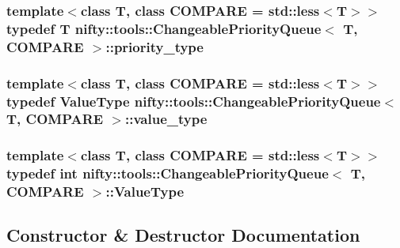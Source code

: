 \subsubsection[{priority\+\_\+type}]{\setlength{\rightskip}{0pt plus 5cm}template$<$class T, class C\+O\+M\+P\+A\+R\+E = std\+::less$<$\+T$>$$>$ typedef T {\bf nifty\+::tools\+::\+Changeable\+Priority\+Queue}$<$ T, C\+O\+M\+P\+A\+R\+E $>$\+::{\bf priority\+\_\+type}}\label{classnifty_1_1tools_1_1ChangeablePriorityQueue_a6ecafb387f99a1cfa7ff5795c924682c}
\hypertarget{classnifty_1_1tools_1_1ChangeablePriorityQueue_aa00fbc748b94bdc6175b4c49bb2bba48}{}
\subsubsection[{value\+\_\+type}]{\setlength{\rightskip}{0pt plus 5cm}template$<$class T, class C\+O\+M\+P\+A\+R\+E = std\+::less$<$\+T$>$$>$ typedef {\bf Value\+Type} {\bf nifty\+::tools\+::\+Changeable\+Priority\+Queue}$<$ T, C\+O\+M\+P\+A\+R\+E $>$\+::{\bf value\+\_\+type}}\label{classnifty_1_1tools_1_1ChangeablePriorityQueue_aa00fbc748b94bdc6175b4c49bb2bba48}
\hypertarget{classnifty_1_1tools_1_1ChangeablePriorityQueue_a3b9e96ad70a62b02b4a117d58f758a1f}{}
\subsubsection[{Value\+Type}]{\setlength{\rightskip}{0pt plus 5cm}template$<$class T, class C\+O\+M\+P\+A\+R\+E = std\+::less$<$\+T$>$$>$ typedef int {\bf nifty\+::tools\+::\+Changeable\+Priority\+Queue}$<$ T, C\+O\+M\+P\+A\+R\+E $>$\+::{\bf Value\+Type}}\label{classnifty_1_1tools_1_1ChangeablePriorityQueue_a3b9e96ad70a62b02b4a117d58f758a1f}


\subsection{Constructor \& Destructor Documentation}
\hypertarget{classnifty_1_1tools_1_1ChangeablePriorityQueue_a5882abdd882fadd12ba20fd181b80c00}{}
